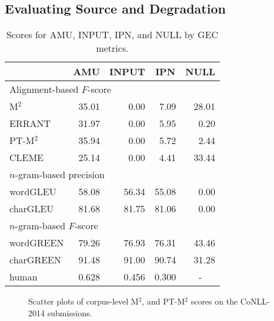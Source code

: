 \documentclass[11pt]{article}
\begin{document}
\subsection{Evaluating Source and Degradation}
\label{sec:degradation}

\begin{table}[!t]
    \centering
    \setlength{\tabcolsep}{5pt}
    \begin{tabular}{lrrrr}
        \hline
        & \multicolumn{1}{c}{AMU} & \multicolumn{1}{c}{INPUT} & \multicolumn{1}{c}{IPN} & \multicolumn{1}{c}{NULL} \\
        \hline
        \multicolumn{5}{l}{Alignment-based $F$-score} \\
        M${}^2$ & 35.01 & 0.00 & 7.09 & 28.01 \\
        ERRANT & 31.97 & 0.00 & 5.95 & 0.20 \\
        PT-M${}^2$ & 35.94 & 0.00 & 5.72 & 2.44 \\
        CLEME & 25.14 & 0.00 & 4.41 & 33.44 \\
        \hline
        \multicolumn{5}{l}{$n$-gram-based precision} \\
        wordGLEU & 58.08 & 56.34 & 55.08 & 0.00 \\
        charGLEU & 81.68 & 81.75 & 81.06 & 0.00 \\
        \hline
        \multicolumn{5}{l}{$n$-gram-based $F$-score} \\
        wordGREEN & 79.26 & 76.93 & 76.31 & 43.46 \\
        charGREEN & 91.48 & 91.00 & 90.74 & 31.28 \\
        \hline
        human & 0.628 & 0.456 & 0.300 & \multicolumn{1}{c}{-} \\
        \hline
    \end{tabular}
    \caption{Scores for \textsf{AMU}, \textsf{INPUT}, \textsf{IPN}, and \textsf{NULL} by GEC metrics.}
    \label{tab:degradation}
\end{table}

\begin{figure}[!t]
    \centering
    
    \scattercorpusmaxmatch %
    \scattercorpusptmaxmatch %
    \caption{Scatter plots of corpus-level M${}^2$, and PT-M${}^2$ scores on the CoNLL-2014 submissions.}
    \label{fig:corpus_maxmatch_scatters}
\end{figure}
\end{document}
